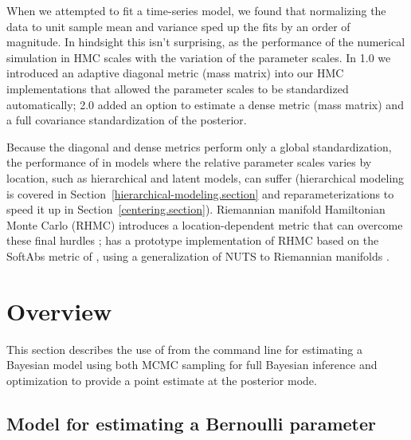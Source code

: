 \documentclass[article]{jss}
\begin{document}
When we attempted to fit a time-series model, we found that
normalizing the data to unit sample mean and variance sped up the fits
by an order of magnitude.  In hindsight this isn't surprising, as the
performance of the numerical simulation in HMC scales with the
variation of the parameter scales.  In  1.0 we
introduced an adaptive diagonal metric (mass matrix) into our HMC
implementations that allowed the parameter scales to be standardized
automatically;  2.0 added an option to estimate a dense metric
(mass matrix) and a full covariance standardization of the posterior.

Because the diagonal and dense metrics perform only a global
standardization, the performance of  in models where
the relative parameter scales varies by location, such as hierarchical
and latent models, can suffer (hierarchical modeling is covered in
Section~\ref{hierarchical-modeling.section} and reparameterizations to speed it
up in Section~\ref{centering.section}).  Riemannian manifold Hamiltonian Monte
Carlo (RHMC) introduces a location-dependent metric that can overcome
these final hurdles \citep{GirolamiCalderhead:2011};  has a
prototype implementation of RHMC based on the SoftAbs metric of
\citep{Betancourt:2012}, using a generalization of NUTS to Riemannian
manifolds \citep{Betancourt:2013}.

\section{Overview}

This section describes the use of  from the command
line for estimating a Bayesian model using both MCMC sampling for full
Bayesian inference and optimization to provide a point estimate at the
posterior mode.

\subsection{Model for estimating a Bernoulli parameter}
\end{document}
